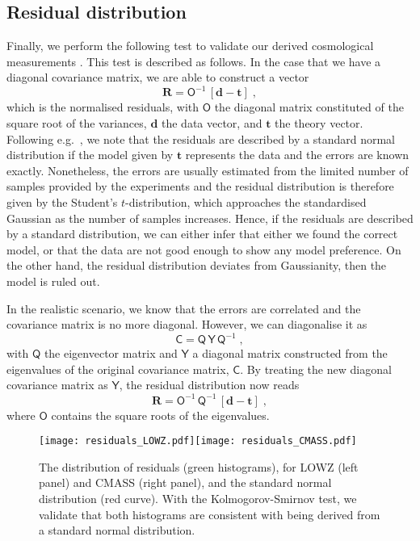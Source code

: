 \documentclass[astrosymb,twocolumn]{aastex631}
\begin{document}
\subsection{Residual distribution}
Finally, we perform the following test to validate our derived cosmological measurements \citep[see also][]{Loureiro2019}. This test is described as follows. In the case that we have a diagonal covariance matrix, we are able to construct a vector
\begin{equation}
\bm R = \mathsf O^{-1}\, [\bm d-\bm t]\;,
    \label{eq:residuals1}
\end{equation}
which is the normalised residuals, with \(\mathsf O\) the diagonal matrix constituted of the square root of the variances, \(\bm d\) the data vector, and \(\bm t\) the theory vector. Following e.g.\ \citet{andrae2010dos}, we note that the residuals are described by a standard normal distribution if the model given by \(\bm t\) represents the data and the errors are known exactly. Nonetheless, the errors are usually estimated from the limited number of samples provided by the experiments and the residual distribution is therefore given by the Student's \(t\)-distribution, which approaches the standardised Gaussian as the number of samples increases. Hence, if the residuals are described by a standard distribution, we can either infer that either we found the correct model, or that the data are not good enough to show any model preference. On the other hand, the residual distribution deviates from Gaussianity, then the model is ruled out.

In the realistic scenario, we know that the errors are correlated and the covariance matrix is no more diagonal. However, we can diagonalise it as
\begin{equation}
\mathsf C = \mathsf Q\, \mathsf Y\, \mathsf Q^{-1}\;,
    \label{eq:residuals2}
\end{equation}
with \(\mathsf Q\) the eigenvector matrix and \(\mathsf Y\) a diagonal matrix constructed from the eigenvalues of the original covariance matrix, \(\mathsf C\). By treating the new diagonal covariance matrix as \(\mathsf Y\), the residual distribution now reads
\begin{equation}
\bm R = \mathsf O^{-1}\, \mathsf Q^{-1} \,[\bm d - \bm t]\;,
    \label{eq:residuals}
\end{equation}
where \(\mathsf O\) contains the square roots of the eigenvalues.
\begin{figure*}
\centering
\texttt{[image: residuals\_LOWZ.pdf]}\texttt{[image: residuals\_CMASS.pdf]}
\caption{The distribution of residuals (green histograms), for LOWZ (left panel) and CMASS (right panel), and the standard normal distribution (red curve). With the Kolmogorov-Smirnov test, we validate that both histograms are consistent with being derived from a standard normal distribution.
}
\label{fig:residuals}
\end{figure*}
\end{document}
